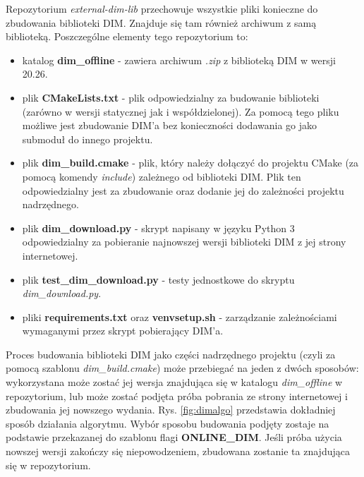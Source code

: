 Repozytorium \textit{external-dim-lib} przechowuje wszystkie pliki konieczne do zbudowania biblioteki DIM. Znajduje się tam również archiwum z samą biblioteką. Poszczególne elementy tego repozytorium to:
\begin{itemize}
\item katalog \textbf{dim\_offline} - zawiera archiwum \textit{.zip} z biblioteką DIM w wersji 20.26.
\item plik \textbf{CMakeLists.txt} - plik odpowiedzialny za budowanie biblioteki (zarówno w wersji statycznej jak i współdzielonej). Za pomocą tego pliku możliwe jest zbudowanie DIM'a bez konieczności dodawania go jako submoduł do innego projektu.
\item plik \textbf{dim\_build.cmake} - plik, który należy dołączyć do projektu CMake (za pomocą komendy \textit{include}) zależnego od biblioteki DIM. Plik ten odpowiedzialny jest za zbudowanie oraz dodanie jej do zależności projektu nadrzędnego.
\item plik \textbf{dim\_download.py} - skrypt napisany w języku Python 3 odpowiedzialny za pobieranie najnowszej wersji biblioteki DIM z jej strony internetowej.
\item plik \textbf{test\_dim\_download.py} - testy jednostkowe do skryptu \textit{dim\_download.py}.
\item pliki \textbf{requirements.txt} oraz \textbf{venvsetup.sh} - zarządzanie zależnościami wymaganymi przez skrypt pobierający DIM'a.
\end{itemize}

Proces budowania biblioteki DIM jako części nadrzędnego projektu (czyli za pomocą szablonu \textit{dim\_build.cmake}) może przebiegać na jeden z dwóch sposobów: wykorzystana może zostać jej wersja znajdująca się w katalogu \textit{dim\_offline} w repozytorium, lub może zostać podjęta próba pobrania ze strony internetowej i zbudowania jej nowszego wydania. Rys. \ref{fig:dimalgo} przedstawia dokładniej sposób działania algorytmu. Wybór sposobu budowania podjęty zostaje na podstawie przekazanej do szablonu flagi \textbf{ONLINE\_DIM}. Jeśli próba użycia nowszej wersji zakończy się niepowodzeniem, zbudowana zostanie ta znajdująca się w repozytorium.

